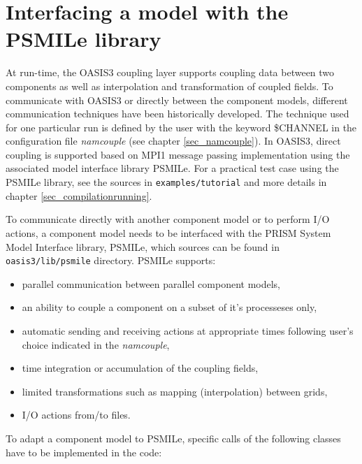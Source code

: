 \newpage
\chapter{Interfacing a model with the PSMILe library}
\label{sec_modelinterfacing}

At run-time, the OASIS3 coupling layer supports coupling data
between two components as well as interpolation and transformation
of coupled fields. To communicate with OASIS3 or directly between the component
models, different communication techniques have been historically
developed. The technique used for one particular run is defined by the
user with the keyword \$CHANNEL in the configuration file {\it namcouple} 
(see chapter
\ref{sec_namcouple}). In OASIS3, direct coupling is supported 
based on MPI1 message passing implementation
using the associated model interface library PSMILe.  For
a practical test case using the PSMILe library, see the sources in
{\tt examples/tutorial} and more details in
chapter \ref{sec_compilationrunning}.

 To communicate directly with another component model
  or to perform I/O actions, a component model needs to be interfaced
  with the PRISM System Model Interface library, PSMILe, which sources
  can be found in {\tt oasis3/lib/psmile} directory. PSMILe supports:

\begin{itemize}
\item parallel communication between parallel component models,
\item an ability to couple a component on a subset of it's processeses only,
\item automatic sending and receiving actions at appropriate times
 following user's choice indicated in the {\it namcouple},
\item time integration or accumulation of the coupling fields,
\item limited transformations such as mapping (interpolation) between grids,
\item I/O actions from/to files.
\end{itemize}

 To adapt a component model to PSMILe, specific calls of
 the following classes have to be implemented in the code:

